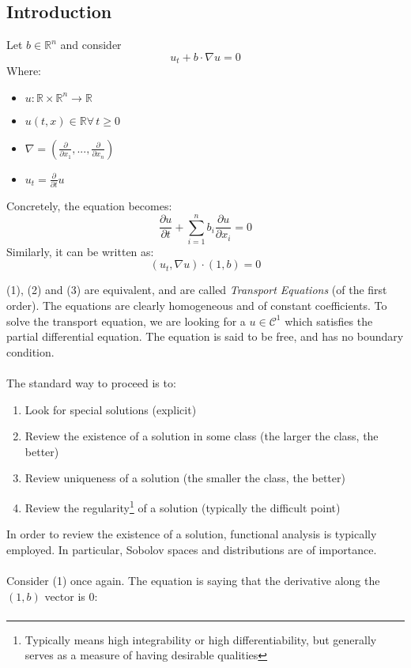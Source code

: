 \documentclass[12pt]{article}
\begin{document}
\subsection{Introduction}
\label{sub:introduction}
Let $b\in\mathbb{R}^{n}$ and consider
\begin{equation}
u_t+b\cdot \nabla u=0   
\end{equation}
Where:
\begin{itemize}
    \item $u:\mathbb{R}\times\mathbb{R}^{n}\to \mathbb{R}$
    \item $u(t,x)\in\mathbb{R} \forall\, t\ge 0$
    \item $\nabla =(\frac{\partial}{\partial x_1},...,\frac{\partial}{\partial x_n})$
    \item $u_t=\frac{\partial }{\partial t}u$
\end{itemize}
Concretely, the equation becomes:
\begin{equation}
    \frac{\partial u}{\partial t}+\sum_{i=1}^n b_i\frac{\partial u}{\partial x_i}=0 
\end{equation}
Similarly, it can be written as:
\begin{equation}
    (u_t, \nabla u)\cdot(1,b)=0
\end{equation}

(1), (2) and (3) are equivalent, and are called \emph{Transport Equations} (of the first order). 
The equations are clearly homogeneous and of constant coefficients. 
To solve the transport equation, we are looking for a $u\in\mathcal{C}^{1}$ which satisfies the partial differential equation. 
The equation is said to be free, and has no boundary condition.
\\\\
The standard way to proceed is to:
\begin{enumerate}
    \item Look for special solutions (explicit)
    \item Review the existence of a solution in some class (the larger the class, the better)
    \item Review uniqueness of a solution (the smaller the class, the better)
    \item Review the regularity\footnote[1]{Typically means high integrability or high differentiability, but generally serves as a measure of having desirable qualities} of a solution (typically the difficult point)
\end{enumerate}
In order to review the existence of a solution, functional analysis is typically employed. In particular, Sobolov spaces and distributions are of importance.\\\\
Consider (1) once again. The equation is saying that the derivative along the $(1,b)$ vector is 0:
\begin{gather*}
    
\end{gather*}
\end{document}
